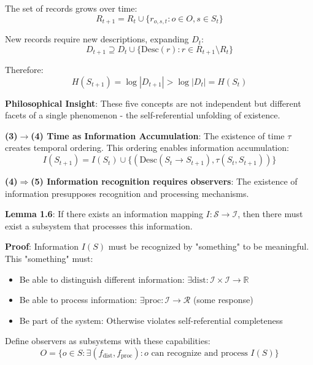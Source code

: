 The set of records grows over time:
\begin{equation}
R_{t+1} = R_t \cup \{r_{o,s,t}: o \in O, s \in S_t\}
\end{equation}

New records require new descriptions, expanding $D_t$:
\begin{equation}
D_{t+1} \supseteq D_t \cup \{\text{Desc}(r): r \in R_{t+1} \setminus R_t\}
\end{equation}

Therefore:
\begin{equation}
H(S_{t+1}) = \log |D_{t+1}| > \log |D_t| = H(S_t)
\end{equation}

\textbf{Philosophical Insight}: These five concepts are not independent but different facets of a single phenomenon - the self-referential unfolding of existence.

\textbf{(3)$\rightarrow$(4) Time as Information Accumulation}:
The existence of time $\tau$ creates temporal ordering.
This ordering enables information accumulation:
\begin{equation}
I(S_{t+1}) = I(S_t) \cup \{(\text{Desc}(S_t \to S_{t+1}), \tau(S_t, S_{t+1}))\}
\end{equation}

\textbf{(4)$\Rightarrow$(5) Information recognition requires observers}:
The existence of information presupposes recognition and processing mechanisms.

\textbf{Lemma 1.6}: If there exists an information mapping $I: \mathcal{S} \to \mathcal{I}$, then there must exist a subsystem that processes this information.
\label{lem:1.6}

\textbf{Proof}: Information $I(S)$ must be recognized by "something" to be meaningful. This "something" must:
\begin{itemize}
\item Be able to distinguish different information: $\exists \text{dist}: \mathcal{I} \times \mathcal{I} \to \mathbb{R}$
\item Be able to process information: $\exists \text{proc}: \mathcal{I} \to \mathcal{R}$ (some response)
\item Be part of the system: Otherwise violates self-referential completeness
\end{itemize}

Define observers as subsystems with these capabilities:
\begin{equation}
O = \{o \in S: \exists (f_{\text{dist}}, f_{\text{proc}}): o \text{ can recognize and process } I(S)\}
\end{equation}

